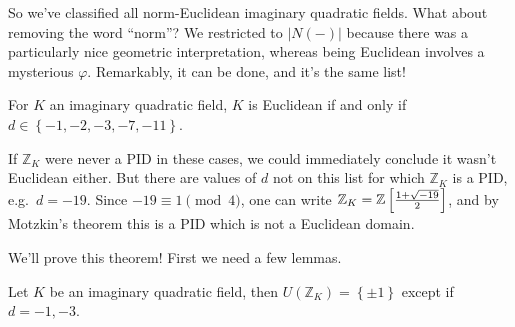 \begin{remark}

So we've classified all norm-Euclidean imaginary quadratic fields. What
about removing the word ``norm''? We restricted to
\({\left\lvert {N({-})} \right\rvert}\) because there was a particularly
nice geometric interpretation, whereas being Euclidean involves a
mysterious \(\varphi\). Remarkably, it can be done, and it's the same
list!

\end{remark}

\begin{theorem}[Motzkin]

For \(K\) an imaginary quadratic field, \(K\) is Euclidean if and only
if \(d\in \left\{{-1,-2,-3,-7,-11}\right\}\).

\end{theorem}

\begin{remark}

If \({\mathbb{Z}}_K\) were never a PID in these cases, we could
immediately conclude it wasn't Euclidean either. But there are values of
\(d\) not on this list for which \({\mathbb{Z}}_K\) is a PID,
e.g.~\(d=-19\). Since \(-19 \equiv 1 \pmod 4\), one can write
\({\mathbb{Z}}_K = {\mathbb{Z}}\left[ {1 + \sqrt{-19} \over 2}\right]\),
and by Motzkin's theorem this is a PID which is not a Euclidean domain.

\end{remark}

\begin{remark}

We'll prove this theorem! First we need a few lemmas.

\end{remark}

\begin{lemma}

Let \(K\) be an imaginary quadratic field, then
\(U({\mathbb{Z}}_K) = \left\{{\pm 1 }\right\}\) except if \(d=-1, -3\).

\end{lemma}

